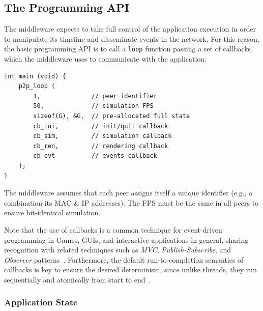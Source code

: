 \documentclass[12pt]{article}
\newcommand{\code}[1]  {\texttt{\small{#1}}}
\begin{document}
\subsection{The Programming API}
\label{sec.tml.api}

The middleware expects to take full control of the application execution in
order to manipulate its timeline and disseminate events in the network.
For this reason, the basic programming API is to call a \code{loop} function
passing a set of callbacks, which the middleware uses to communicate with the
application:

{\footnotesize
\begin{verbatim}
int main (void) {
    p2p_loop (
        1,              // peer identifier
        50,             // simulation FPS
        sizeof(G), &G,  // pre-allocated full state
        cb_ini,         // init/quit callback
        cb_sim,         // simulation callback
        cb_ren,         // rendering callback
        cb_evt          // events callback
    );
}
\end{verbatim}
}

The middleware assumes that each peer assigns itself a unique identifier (e.g.,
a combination its MAC \& IP addresses).
The FPS must be the same in all peers to ensure bit-identical simulation.

Note that the use of callbacks is a common technique for event-driven
programming in Games, GUIs, and interactive applications in general, sharing
recognition with related techniques such as \emph{MVC},
\emph{Publish-Subscribe}, and \emph{Observer} patterns~\cite{meyer,nystrom}.
%
Furthermore, the default run-to-completion semantics of callbacks is key to
ensure the desired determinism, since unlike threads, they run sequentially and
atomically from start to end~\cite{events,threads}.


\subsubsection{Application State}
\label{sec.tml.api.state}
\end{document}
